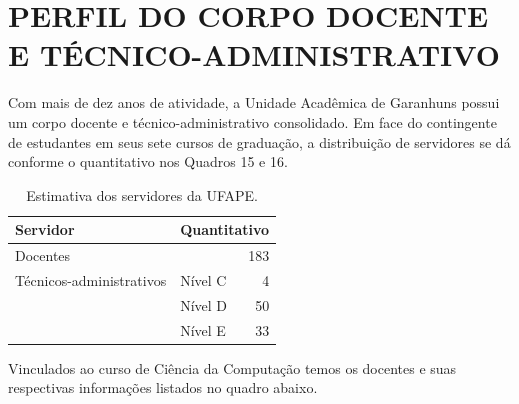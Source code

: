 \documentclass[
	12pt,				%
	openright,			%
  oneside,     %
	a4paper,			%
	chapter=TITLE,		%
	english,			%
	french,				%
	spanish,			%
	brazil				%
	]{abntex2}
\begin{document}
%
%



\chapter{PERFIL DO CORPO DOCENTE E TÉCNICO-ADMINISTRA\-TI\-VO}

Com mais de dez anos de atividade, a Unidade Acadêmica de Garanhuns possui um corpo docente e técnico-administrativo consolidado. Em face do contingente de estudantes em seus sete cursos de graduação, a distribuição de servidores se dá conforme o quantitativo nos Quadros 15 e 16.

\begin{center}
  
  \begin{scriptsize}
    \begin{longtable}{llr}
      \caption{\label{quadro:estimativa-servidores-ufape}Estimativa dos servidores da UFAPE.}\\
  \toprule
  \textbf{Servidor} & \multicolumn{2}{l}{\textbf{Quantitativo}}\\ 
    \midrule
    Docentes                 & \multicolumn{2}{r}{183} \\ \midrule
    Técnicos-administrativos & Nível C & 4 \\ 
                             & Nível D & 50 \\ 
                             & Nível E & 33 \\
    \bottomrule
\end{longtable}
\end{scriptsize}      
\end{center}
Vinculados ao curso de Ciência da Computação temos os docentes e suas respectivas informações listados no quadro abaixo.
\end{document}
